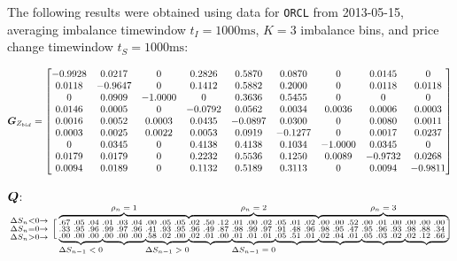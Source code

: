 The following results were obtained using data for \texttt{ORCL} from 2013-05-15, averaging imbalance timewindow $t_I = 1000\text{ms}$, $K=3$ imbalance bins, and price change timewindow $t_S = 1000\text{ms}$:

$$\mat{G}_{Z_{bid}} =
\begin{bmatrix}
-0.9928 &   0.0217   &      0 &   0.2826  &  0.5870  &  0.0870  &       0   & 0.0145     &    0 \\

    0.0118  & -0.9647   &     0  &  0.1412 &   0.5882 &   0.2000   &      0   & 0.0118  &  0.0118 \\
         0  &  0.0909  & -1.0000   &      0  &  0.3636  &  0.5455  &       0     & 0  &       0 \\
    0.0146  &  0.0005     &    0  & -0.0792  &  0.0562   & 0.0034 &   0.0036   & 0.0006  &  0.0003 \\
    0.0016 &   0.0052   & 0.0003 &   0.0435  & -0.0897 &   0.0300  &       0   & 0.0080 &   0.0011 \\
    0.0003&    0.0025 &   0.0022  &  0.0053   & 0.0919  & -0.1277     &    0   & 0.0017 &   0.0237 \\
         0  &  0.0345   &      0  &  0.4138  &  0.4138  &  0.1034 &  -1.0000   & 0.0345    &     0 \\
    0.0179   & 0.0179    &     0   & 0.2232   & 0.5536  &  0.1250 &   0.0089  & -0.9732 &   0.0268 \\
    0.0094&    0.0189   &      0  &  0.1132&    0.5189 &  0.3113    &     0   & 0.0094 &  -0.9811
\end{bmatrix}$$

$\boldsymbol{Q}$:

$$  \begin{smallmatrix}
    \Delta S_n < 0 \rightarrow \\
    \Delta S_n = 0 \rightarrow \\
    \Delta S_n > 0 \rightarrow
  \end{smallmatrix}
  \left [
    \begin{smallmatrix}
\overmat{\rho_n = 1}{.67 & .05 & .04 & .01 & .03 & .04 & .00 & .05 & .05} & \overmat{\rho_n = 2}{.02 & .50 & .12 & .01 & .00 & .02 & .05 & .01 & .02} & 
\overmat{\rho_n = 3}{.00 & .00 & .52 & .00 & .01 & .00 & .00 & .00 & .00} \\
.33 & .95 & .96 & .99 & .97 & .96 & .41 & .93 & .95 & .96 & .49 & .87 & .98 & .99 & .97 & .91 & .48 & .96 & .98 & .95 & .47 & .95 & .96 & .93 & .98 & .88 & .34 \\ \undermat{\Delta S_{n-1} < 0}{.00 & .00 & .00} & 
\undermat{}{.00 & .00 & .00} & 
\undermat{\Delta S_{n-1} > 0}{.58 & .02 & .00} & 
\undermat{}{.02 & .01 & .00} & 
\undermat{\Delta S_{n-1} = 0}{.01 & .01 & .01} & 
\undermat{}{.05 & .51 & .01} & 
\undermat{}{.02 & .04 & .01} & 
\undermat{}{.05 & .03 & .02} & 
\undermat{}{.02 & .12 & .66}
    \end{smallmatrix}
  \right ]
$$

